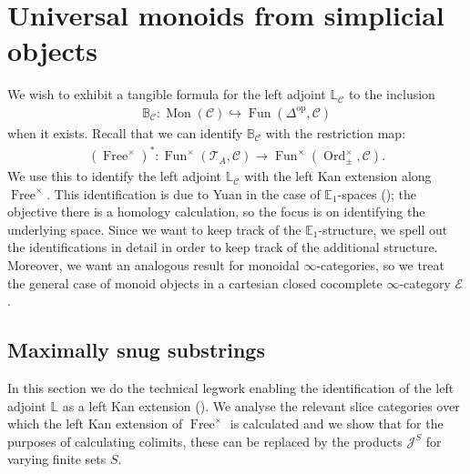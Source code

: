 \documentclass[12pt, reqno]{amsart}
\theoremstyle{plain}
\theoremstyle{definition}
\begin{document}
\section{Universal monoids from simplicial objects}\label{unravelling}

We wish to exhibit a tangible formula for the left adjoint $\mathbb{L}_\mathcal{C}$ to the inclusion
\begin{align*}
\mathbb{B}_\mathcal{C}\colon \operatorname{Mon}(\mathcal{C})\hookrightarrow \operatorname{Fun}(\Delta^{\operatorname{op}}, \mathcal{C})
\end{align*}
when it exists. Recall that we can identify $\mathbb{B}_{\mathcal{C}}$ with the restriction map:
\begin{align*}
(\operatorname{Free}^\times)^*\colon \operatorname{Fun}^\times(\mathcal{T}_A,\mathcal{C})\rightarrow \operatorname{Fun}^\times( \operatorname{Ord}_\pm^\times, \mathcal{C}).
\end{align*}
We use this to identify the left adjoint $\mathbb{L}_{\mathcal{C}}$ with the left Kan extension along $\operatorname{Free}^\times$. This identification is due to Yuan in the case of $\mathbb{E}_1$-spaces (\cite[Proposition 5.10]{Yuan}); the objective there is a homology calculation, so the focus is on identifying the underlying space. Since we want to keep track of the $\mathbb{E}_1$-structure, we spell out the identifications in detail in order to keep track of the additional structure. Moreover, we want an analogous result for monoidal $\infty$-categories, so we treat the general case of monoid objects in a cartesian closed cocomplete $\infty$-category $\mathcal{E}$.

\subsection{Maximally snug substrings}\label{maximally snug substrings}

In this section we do the technical legwork enabling the identification of the left adjoint $\mathbb{L}$ as a left Kan extension (). We analyse the relevant slice categories over which the left Kan extension of $\operatorname{Free}^\times$ is calculated and we show that for the purposes of calculating colimits, these can be replaced by the products $\mathcal{J}^S$ for varying finite sets $S$.
\end{document}
